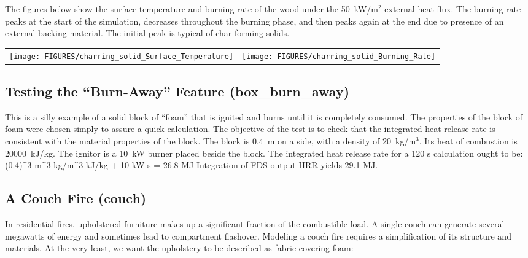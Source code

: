 \documentclass[11pt]{book}
\begin{document}
The figures below show the surface temperature and burning rate of the wood under the 50~kW/m$^2$ external heat flux. The burning rate peaks at the
start of the simulation, decreases throughout the burning phase, and then peaks again at the end due to presence of an external backing material. The
initial peak is typical of char-forming solids.

\noindent
\begin{tabular*}{\textwidth}{lr}
\texttt{[image: FIGURES/charring\_solid\_Surface\_Temperature]} &
\texttt{[image: FIGURES/charring\_solid\_Burning\_Rate]}
\end{tabular*}





\clearpage
\subsection{Testing the ``Burn-Away'' Feature ({\bf box\_burn\_away}) }

This is a silly example of a solid block of ``foam'' that is ignited
and burns until it is completely consumed.  The properties of the
block of foam were chosen simply to assure a quick calculation. The
objective of the test is to check that the integrated heat release
rate is consistent with the material properties of the block.  The
block is 0.4~m on a side, with a density of 20~kg/m$^3$. Its heat of
combustion is 20000~kJ/kg. The ignitor is a 10~kW burner placed beside
the block. The integrated heat release rate for a 120 s calculation
ought to be:
\be
(0.4)^3 \; \hbox{m}^3  \; \hbox{kg/m}^3
 \; \hbox{kJ/kg} + 10 \; \hbox{kW}  \; \hbox{s} =
26.8 \; \hbox{MJ}
\ee
Integration of FDS output HRR yields 29.1 MJ.



\clearpage
\subsection{A Couch Fire ({\bf couch}) }

In residential fires, upholstered furniture makes up a significant fraction of the combustible load. A single couch can generate several
megawatts of energy and sometimes lead to compartment flashover. Modeling a couch fire requires a simplification of its structure and materials.
At the very least, we want the upholstery to be described as fabric covering foam:
\end{document}
